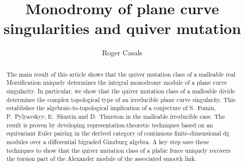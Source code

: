 \documentclass[11pt,reqno]{amsart}
\title[Monodromy of plane curve singularities and quiver mutation]
{Monodromy of plane curve singularities and quiver mutation}
\author{Roger Casals}
\numberwithin{equation}{section}
\theoremstyle{definition}
\begin{document}
\begin{abstract}
The main result of this article shows that the quiver mutation class of a malleable real Morsification uniquely determines the integral monodromy module of a plane curve singularity. In particular, we show that the quiver mutation class of a malleable divide determines the complex topological type of an irreducible plane curve singularity. This establishes the algebraic-to-topological implication of a conjecture of S.~Fomin, P.~Pylyavskyy, E.~Shustin and D.~Thurston in the malleable irreducible case. The result is proven by developing representation-theoretic techniques based on an equivariant Euler pairing in the derived category of continuous finite-dimensional dg modules over a differential bigraded Ginzburg algebra. A key step uses these techniques to show that the quiver mutation class of a plabic fence uniquely recovers the torsion part of the Alexander module of the associated smooth link.
\end{abstract}

\maketitle
\setcounter{tocdepth}{2}
\tableofcontents











\end{document}
